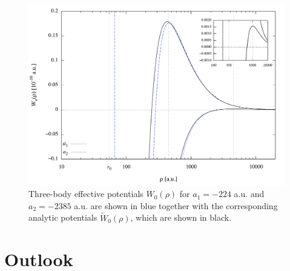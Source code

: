 \begin{figure}
	\includegraphics[width=\linewidth]{barrier_analytic.pdf}
	\caption{Three-body effective potentials $W_0(\rho)$ for $a_1=-224$ a.u. and $a_2=-2385$ a.u. are shown in blue together with the corresponding analytic potentials $\widetilde{W}_0(\rho)$, which are shown in black.}
	\label{fig:barrier_analytic}
\end{figure}

\chapter{Outlook}